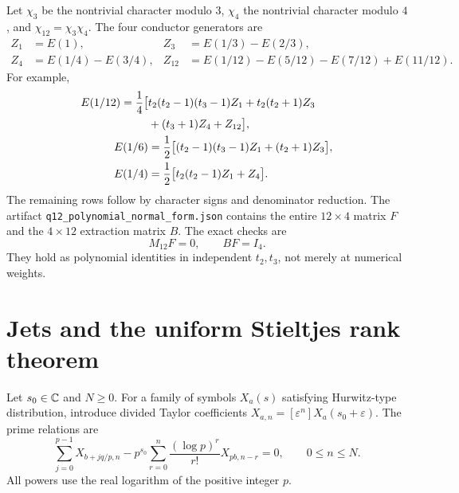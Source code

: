 \documentclass[11pt]{article}
\numberwithin{equation}{section}
\theoremstyle{definition}\newtheorem{definition}[theorem]{Definition}
\theoremstyle{remark}\newtheorem{remark}[theorem]{Remark}
\newcommand{\eps}{\varepsilon}
\newcommand{\code}[1]{\texttt{\small #1}}
\begin{document}
Let $\chi_3$ be the nontrivial character modulo $3$, $\chi_4$ the
nontrivial character modulo $4$, and $\chi_{12}=\chi_3\chi_4$.
The four conductor generators are
\begin{align}
Z_1&=E(1),&
Z_3&=E(1/3)-E(2/3),\\
Z_4&=E(1/4)-E(3/4),&
Z_{12}&=E(1/12)-E(5/12)-E(7/12)+E(11/12).
\end{align}
For example,
\begin{align}\label{eq:q12example}
E(1/12)=\frac14\bigl[&t_2(t_2-1)(t_3-1)Z_1
+t_2(t_2+1)Z_3\notag\\
&+(t_3+1)Z_4+Z_{12}\bigr],\\
E(1/6)&=\frac12\bigl[(t_2-1)(t_3-1)Z_1+(t_2+1)Z_3\bigr],\\
E(1/4)&=\frac12\bigl[t_2(t_2-1)Z_1+Z_4\bigr].
\end{align}
The remaining rows follow by character signs and denominator reduction.
The artifact \code{q12\_polynomial\_normal\_form.json} contains the entire
$12\times4$ matrix $F$ and the $4\times12$ extraction matrix $B$.
The exact checks are
\begin{equation}\label{eq:certificateq12}
M_{12}F=0,\qquad BF=I_4.
\end{equation}
They hold as polynomial identities in independent $t_2,t_3$, not merely
at numerical weights.

\section{Jets and the uniform Stieltjes rank theorem}

Let $s_0\in\mathbb C$ and $N\ge0$. For a family of symbols $X_a(s)$ satisfying
Hurwitz-type distribution, introduce divided Taylor coefficients
$X_{a,n}=[\eps^n]X_a(s_0+\eps)$. The prime relations are
\begin{equation}\label{eq:jetrows}
\sum_{j=0}^{p-1}X_{b+jq/p,n}
-p^{s_0}\sum_{r=0}^{n}\frac{(\log p)^r}{r!}X_{pb,n-r}=0,
\qquad 0\le n\le N.
\end{equation}
All powers use the real logarithm of the positive integer $p$.
\end{document}
